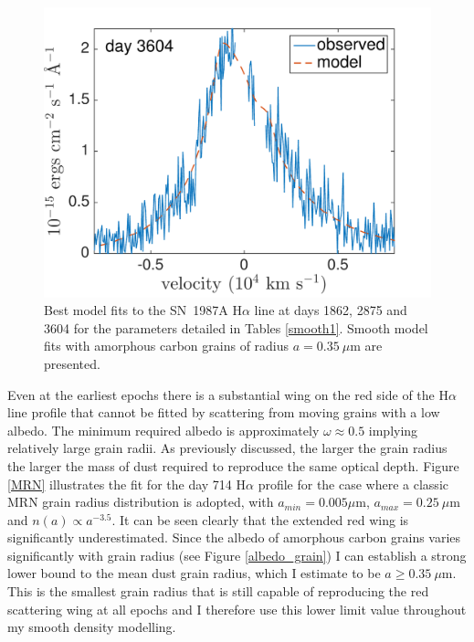 \begin{figure}
\includegraphics[trim =0 0 0 -30,clip=true,scale=0.37]{chapters/chapter5/images/smooth/best_fit/d3604Ha.pdf}
\caption{Best model fits to the SN~1987A H$\alpha$ line at days 1862, 2875 and 
3604 for the parameters detailed in Tables \ref{smooth1}.  Smooth model fits with amorphous carbon grains of radius $a=0.35~\mu$m are presented.}
\label{smooth_late}
\end{figure}



Even at the earliest epochs there is a substantial wing on the red side of 
the H$\alpha$ line profile that cannot be fitted by scattering from moving 
grains with a low albedo.  The minimum required albedo is approximately 
$\omega \approx 0.5$ implying relatively large grain radii.  As previously 
discussed, the larger the grain radius the larger the mass of dust required 
to reproduce the same optical depth.  Figure \ref{MRN} illustrates the fit 
for the day 714 H$\alpha$ profile for the case where a classic MRN 
\citep{Mathis1977} grain radius distribution is adopted, with $a_{min}=0.005 
\mu$m, $a_{max}=0.25~\mu$m and $n(a) \propto a^{-3.5}$.  It can be seen 
clearly that the extended red wing is significantly underestimated.  
Since the albedo of amorphous carbon grains varies significantly with 
grain radius (see Figure \ref{albedo_grain}) I can establish a strong 
lower bound to the mean dust grain radius, which I estimate to be $a \ge 
0.35~\mu$m.  This is the smallest grain radius that is still capable of 
reproducing the red scattering wing at all epochs and I therefore use 
this lower limit value throughout my smooth density modelling.


